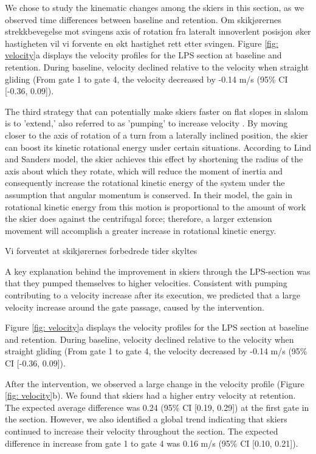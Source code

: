 \documentclass{article}
\begin{document}
We chose to study the kinematic changes among the skiers in this section, as we observed time differences between baseline and retention. Om skikjørernes strekkbevegelse mot svingens axis of rotation fra lateralt innoverlent posisjon øker hastigheten vil vi forvente en økt hastighet rett etter svingen. Figure \ref{fig: velocity}a displays the velocity profiles for the LPS section at baseline and retention. During baseline, velocity declined relative to the velocity when straight gliding (From gate 1 to gate 4, the velocity decreased by -0.14 m/s (95\% CI [-0.36, 0.09]).


The third strategy that can potentially make skiers faster on flat slopes in slalom is to 'extend,' also referred to as 'pumping' to increase velocity \cite{lind_physics_2013}. By moving closer to the axis of rotation of a turn from a laterally inclined position, the skier can boost its kinetic rotational energy under certain situations. According to Lind and Sanders \cite{lind_physics_2013} model, the skier achieves this effect by shortening the radius of the axis about which they rotate, which will reduce the moment of inertia and consequently increase the rotational kinetic energy of the system under the assumption that angular momentum is conserved. In their model, the gain in rotational kinetic energy from this motion is proportional to the amount of work the skier does against the centrifugal force; therefore, a larger extension movement will accomplish a greater increase in rotational kinetic energy.



Vi forventet at skikjørernes forbedrede tider skyltes 



A key explanation behind the improvement in skiers through the LPS-section was that they pumped themselves to higher velocities. Consistent with pumping contributing to a velocity increase after its execution, we predicted that a large velocity increase around the gate passage, caused by the intervention.

Figure \ref{fig: velocity}a displays the velocity profiles for the LPS section at baseline and retention. During baseline, velocity declined relative to the velocity when straight gliding (From gate 1 to gate 4, the velocity decreased by -0.14 m/s (95\% CI [-0.36, 0.09]).

After the intervention, we observed a large change in the velocity profile (Figure \ref{fig: velocity}b). We found that skiers had a higher entry velocity at retention. The expected average difference was 0.24 (95\% CI [0.19, 0.29]) at the first gate in the section. However, we also identified a global trend indicating that skiers continued to increase their velocity throughout the section. The expected difference in increase from gate 1 to gate 4 was 0.16 m/s (95\% CI [0.10, 0.21]).
\end{document}
